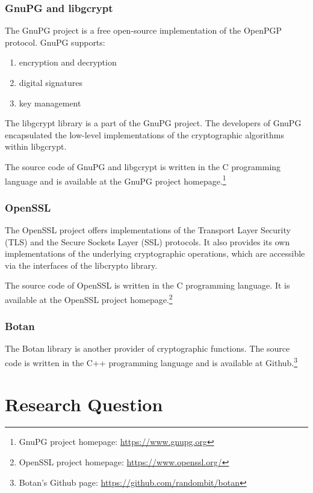   \subsubsection{GnuPG and libgcrypt}

The GnuPG project is a free open-source implementation of the OpenPGP protocol.
GnuPG supports:\cite{gnupg-doc}
\begin{enumerate}
\item encryption and decryption
\item digital signatures
\item key management
\end{enumerate}

The libgcrypt library is a part of the GnuPG project.
The developers of GnuPG encapsulated the low-level implementations of the cryptographic algorithms within libgcrypt.

The source code of GnuPG and libgcrypt is written in the C programming language and is available at the GnuPG project homepage.\footnote{GnuPG project homepage: \url{https://www.gnupg.org}}

  \subsubsection{OpenSSL}

The OpenSSL project offers implementations of the Transport Layer Security (TLS) and the Secure Sockets Layer (SSL) protocols.
It also provides its own implementations of the underlying cryptographic operations, which are accessible via the interfaces of the libcrypto library.

The source code of OpenSSL is written in the C programming language.
It is available at the OpenSSL project homepage.\footnote{OpenSSL project homepage: \url{https://www.openssl.org/}}

  \subsubsection{Botan}

The Botan library is another provider of cryptographic functions.
The source code is written in the C++ programming language and is available at Github.\footnote{Botan's Github page: \url{https://github.com/randombit/botan}}

\section{Research Question}


